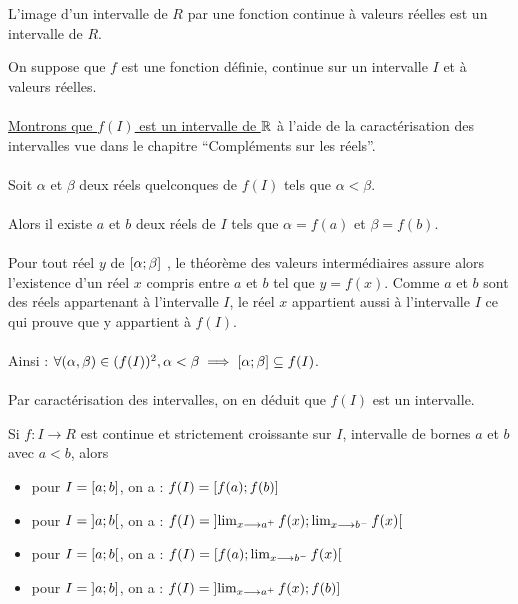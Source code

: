 \begin{defprop}
    L’image d’un intervalle de \(R\) par une fonction continue à valeurs réelles est un intervalle de \(R\).
\end{defprop}
\begin{dem}
    On suppose que \(f\) est une fonction définie, continue sur un intervalle \(I\) et à valeurs réelles.\\~\\
    \underline{Montrons que \(f (I)\) est un intervalle de \(\mathbb{R}\)} à l’aide de la caractérisation des intervalles vue dans le chapitre “Compléments sur les réels”.\\~\\
    Soit \(\alpha\) et \(\beta\) deux réels quelconques de \(f (I)\) tels que \(\alpha < \beta\).\\~\\
    Alors il existe \(a\) et \(b\) deux réels de \(I\) tels que \(\alpha = f (a)\) et \(\beta = f (b)\).\\~\\
    Pour tout réel \(y\) de \(\left[\alpha;\beta\right]\) , le théorème des valeurs intermédiaires assure alors l’existence d’un réel \(x\) compris entre \(a\) et \(b\) tel que \(y = f (x)\). Comme \(a\) et \(b\) sont des réels appartenant à l’intervalle \(I\), le réel \(x\) appartient aussi à l’intervalle \(I\) ce qui prouve que y appartient à \(f (I)\).\\~\\
    Ainsi : \(\forall (\alpha, \beta) \in (f (I))^2 , \alpha < \beta \implies \left[\alpha;\beta\right] \subseteq f (I)\).\\~\\
    Par caractérisation des intervalles, on en déduit que \(f (I)\) est un intervalle.
\end{dem}

\begin{defprop}
    
Si \(f : I \to R\) est continue et strictement croissante sur \(I\), intervalle de bornes \(a\) et \(b\) avec \(a < b\), alors
\begin{itemize}
    \item  pour \(I = \left[a;b\right]\), on a : \(f(I) = \left[f(a);f(b)\right]\)
    \item  pour \(I = \left]a;b\right[\), on a : \(f(I) = \left]\lim_{x\longrightarrow a^+}f(x);\lim_{x\longrightarrow b^-}f(x)\right[\)
    \item  pour \(I = \left[a;b\right[\), on a : \(f(I) = \left[f(a);\lim_{x\longrightarrow b^-}f(x)\right[\)
    \item  pour \(I = \left]a;b\right]\), on a : \(f(I) = \left]\lim_{x\longrightarrow a^+}f(x);f(b)\right]\)
\end{itemize}
\end{defprop}
